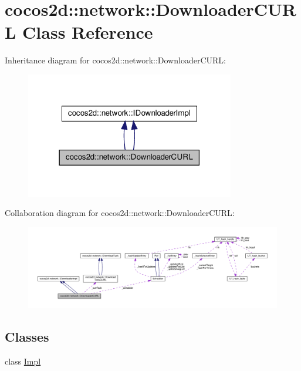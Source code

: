 \hypertarget{classcocos2d_1_1network_1_1DownloaderCURL}{}\section{cocos2d\+:\+:network\+:\+:Downloader\+C\+U\+RL Class Reference}
\label{classcocos2d_1_1network_1_1DownloaderCURL}


Inheritance diagram for cocos2d\+:\+:network\+:\+:Downloader\+C\+U\+RL\+:
\nopagebreak
\begin{figure}[H]
\begin{center}
\leavevmode
\includegraphics[width=259pt]{classcocos2d_1_1network_1_1DownloaderCURL__inherit__graph}
\end{center}
\end{figure}


Collaboration diagram for cocos2d\+:\+:network\+:\+:Downloader\+C\+U\+RL\+:
\nopagebreak
\begin{figure}[H]
\begin{center}
\leavevmode
\includegraphics[width=350pt]{classcocos2d_1_1network_1_1DownloaderCURL__coll__graph}
\end{center}
\end{figure}
\subsection*{Classes}
\begin{DoxyCompactItemize}
\item 
class \hyperlink{classcocos2d_1_1network_1_1DownloaderCURL_1_1Impl}{Impl}
\end{DoxyCompactItemize}
